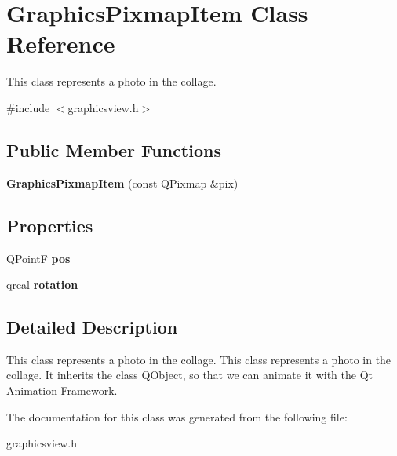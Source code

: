 \hypertarget{class_graphics_pixmap_item}{
\section{GraphicsPixmapItem Class Reference}
\label{class_graphics_pixmap_item}
}


This class represents a photo in the collage.  




{\ttfamily \#include $<$graphicsview.h$>$}

\subsection*{Public Member Functions}
\begin{DoxyCompactItemize}
\item 
\hypertarget{class_graphics_pixmap_item_ac1bb9fe20b2c05c6d93f52da849e481e}{
{\bfseries GraphicsPixmapItem} (const QPixmap \&pix)}
\label{class_graphics_pixmap_item_ac1bb9fe20b2c05c6d93f52da849e481e}

\end{DoxyCompactItemize}
\subsection*{Properties}
\begin{DoxyCompactItemize}
\item 
\hypertarget{class_graphics_pixmap_item_a1c056d5efe18f58fc69a0d0e50fba001}{
QPointF {\bfseries pos}}
\label{class_graphics_pixmap_item_a1c056d5efe18f58fc69a0d0e50fba001}

\item 
\hypertarget{class_graphics_pixmap_item_a4c4ef87115166b4ae3cd155f4827b22f}{
qreal {\bfseries rotation}}
\label{class_graphics_pixmap_item_a4c4ef87115166b4ae3cd155f4827b22f}

\end{DoxyCompactItemize}


\subsection{Detailed Description}
This class represents a photo in the collage. This class represents a photo in the collage. It inherits the class QObject, so that we can animate it with the Qt Animation Framework. 

The documentation for this class was generated from the following file:\begin{DoxyCompactItemize}
\item 
graphicsview.h\end{DoxyCompactItemize}
